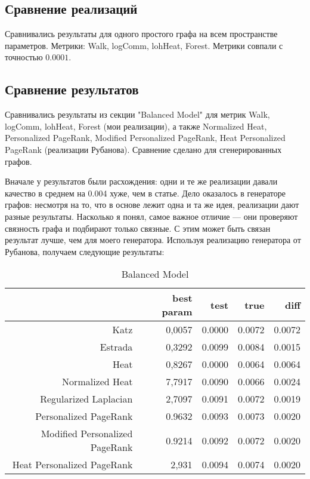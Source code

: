 \documentclass{article}
\begin{document}
\subsection{Сравнение реализаций}
Сравнивались результаты для одного простого графа на всем пространстве параметров. Метрики: Walk, logComm, lohHeat, Forest. Метрики совпали с точностью  $0.0001$.

\subsection{Сравнение результатов}
Сравнивались результаты из секции "Balanced Model" для метрик Walk, logComm, lohHeat, Forest (мои реализации), а также Normalized Heat, Personalized PageRank, Modified Personalized PageRank, Heat Personalized PageRank (реализации Рубанова). Сравнение сделано для сгенерированных графов.

Вначале у результатов были расхождения: одни и те же реализации давали качество в среднем на 0.004 хуже, чем в статье. Дело оказалось в генераторе графов: несмотря на то, что в основе лежит одна и та же идея, реализации дают разные результаты. Насколько я понял, самое важное отличие --- они проверяют связность графа и подбирают только связные. С этим может быть связан результат лучше, чем для моего генератора. Используя реализацию генератора от Рубанова, получаем следующие результаты:

\begin{table}[H]
\centering
\caption{Balanced Model}
\label{my-label}
\begin{tabular}{rr|rrr}
                               & best param & test   & true   & diff   \\
                               \hline
Katz                           & 0,0057     & 0.0000 & 0.0072 & \cellcolor{red!25} 0.0072 \\
Estrada                        & 0,3292     & 0.0099 & 0.0084 & \cellcolor{yellow!25} 0.0015 \\
Heat                           & 0,8267     & 0.0000 & 0.0064 & \cellcolor{red!25} 0.0064 \\
Normalized Heat                & 7,7917     & 0.0090 & 0.0066 & \cellcolor{yellow!25} 0.0024 \\
Regularized Laplacian          & 2,7097     & 0.0091 & 0.0072 & \cellcolor{yellow!25} 0.0019 \\
Personalized PageRank          & 0.9632     & 0.0093 & 0.0073 & \cellcolor{yellow!25} 0.0020 \\
Modified Personalized PageRank & 0.9214     & 0.0092 & 0.0072 & \cellcolor{yellow!25} 0.0020 \\
Heat Personalized PageRank     & 2,931      & 0.0094 & 0.0074 & \cellcolor{yellow!25} 0.0020
\end{tabular}
\end{table}
\end{document}
